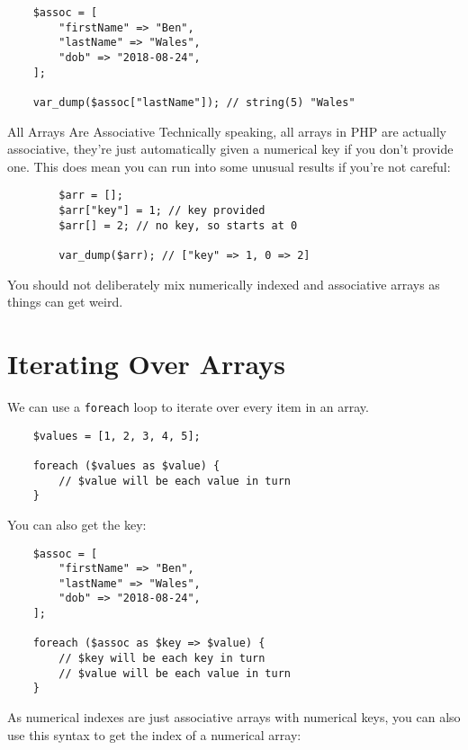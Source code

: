 \begin{verbatim}
    $assoc = [
        "firstName" => "Ben",
        "lastName" => "Wales",
        "dob" => "2018-08-24",
    ];

    var_dump($assoc["lastName"]); // string(5) "Wales"
\end{verbatim}

\begin{infobox}{All Arrays Are Associative}
    Technically speaking, all arrays in PHP are actually associative, they're just automatically given a numerical key if you don't provide one. This does mean you can run into some unusual results if you're not careful:

    \begin{verbatim}
        $arr = [];
        $arr["key"] = 1; // key provided
        $arr[] = 2; // no key, so starts at 0

        var_dump($arr); // ["key" => 1, 0 => 2]
    \end{verbatim}

    You should not deliberately mix numerically indexed and associative arrays as things can get weird.
\end{infobox}


\section{Iterating Over Arrays}

We can use a \texttt{foreach} loop to iterate over every item in an array.

\begin{verbatim}
    $values = [1, 2, 3, 4, 5];

    foreach ($values as $value) {
        // $value will be each value in turn
    }
\end{verbatim}

You can also get the key:

\begin{verbatim}
    $assoc = [
        "firstName" => "Ben",
        "lastName" => "Wales",
        "dob" => "2018-08-24",
    ];

    foreach ($assoc as $key => $value) {
        // $key will be each key in turn
        // $value will be each value in turn
    }
\end{verbatim}

As numerical indexes are just associative arrays with numerical keys, you can also use this syntax to get the index of a numerical array:

